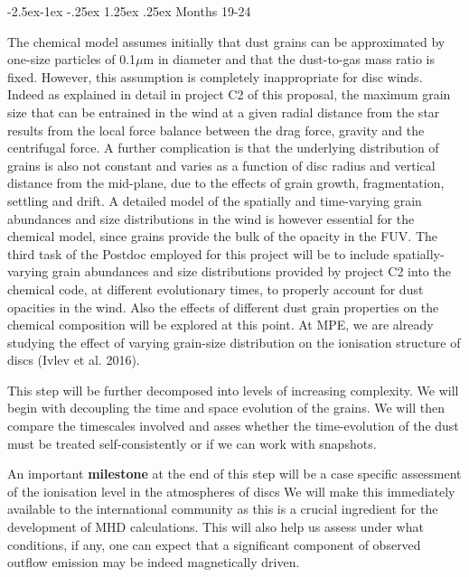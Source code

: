 \documentclass[10pt,fleqn,twoside]{article}
\makeatletter
\renewcommand\paragraph{\@startsection{paragraph}{4}{\z@}%
            {-2.5ex\@plus -1ex \@minus -.25ex}%
            {1.25ex \@plus .25ex}%
            {\normalfont\normalsize\bfseries}}
\makeatother
\begin{document}
\paragraph{ Months 19-24}

 The chemical model assumes initially that dust grains can be approximated by one-size particles of 0.1${\mu}$m in diameter and that the dust-to-gas mass ratio is fixed.  However, this assumption is completely inappropriate for disc winds. Indeed as explained in detail in project C2 of this proposal, the maximum grain size that can be entrained in the wind at a given radial distance from the star results from the local force balance between the drag force, gravity and the centrifugal force. A further complication is that the underlying distribution of grains is also not constant and varies as a function of disc radius and vertical distance from the mid-plane, due to the effects of grain growth, fragmentation, settling and drift. A detailed model of the spatially and time-varying grain abundances and size distributions in the wind is however essential for the chemical model, since grains provide the bulk of the opacity in the FUV. The third task of the Postdoc employed for this project will be to include spatially-varying grain abundances and size distributions
provided by project C2 into the chemical code, at different evolutionary times, to properly account for dust opacities in the wind.  Also the effects of different dust grain properties on the chemical composition will be explored at this point.  At MPE, we are already studying the effect of varying grain-size distribution on the ionisation structure of discs (Ivlev et al. 2016). 

This step will be further decomposed into levels of increasing complexity. We will begin with decoupling the time and space evolution of the grains. We will then compare the timescales involved and asses whether the time-evolution of the dust must be treated self-consistently or if we can work with snapshots. 

An important {\bf milestone} at the end of this step will be a case specific assessment of the ionisation level in the atmospheres of discs We will make this immediately available to the international community as this is a crucial ingredient for the development of MHD calculations. This will also help us assess under what conditions, if any, one can expect that a significant component of observed outflow emission may be indeed magnetically driven. 
\end{document}
